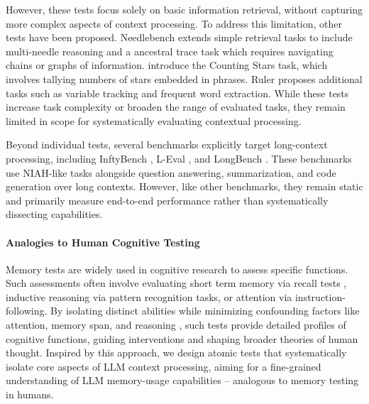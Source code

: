  However, these tests focus solely on basic information retrieval, without capturing more complex aspects of context processing. To address this limitation, other tests have been proposed. Needlebench \cite{ li2024needlebench} extends simple retrieval tasks to include multi-needle reasoning and a ancestral trace task which requires navigating chains or graphs of information. \citet{song2024countingstars} introduce the Counting Stars task, which involves tallying numbers of stars embedded in phrases. Ruler \cite{hsieh2024ruler} proposes additional tasks such as variable tracking and frequent word extraction. While these tests increase task complexity or broaden the range of evaluated tasks, they remain limited in scope for systematically evaluating contextual processing.
 
Beyond individual tests, several benchmarks explicitly target long-context processing, including InftyBench \cite{zhang-etal-2024-bench}, L-Eval \cite{an-etal-2024-l}, and LongBench \cite{bai-etal-2024-longbench}. These benchmarks use NIAH-like tasks alongside question answering, summarization, and code generation over long contexts. However, like other benchmarks, they remain static and primarily measure end-to-end performance rather than systematically dissecting capabilities. 


\paragraph{Analogies to Human Cognitive Testing}
Memory tests are widely used in cognitive research to assess specific functions. Such assessments often involve evaluating short term memory via recall tests \cite{crannell1957comparison, towse2008recall}, inductive reasoning via pattern recognition tasks, or attention via instruction-following\cite{kane2007identifying, nasreddine2005montreal}. By isolating distinct abilities while minimizing confounding factors like attention, memory span, and reasoning \cite{kane2007identifying}, such tests provide detailed profiles of cognitive functions, guiding interventions and shaping broader theories of human thought. Inspired by this approach, we design atomic tests that systematically isolate core aspects of LLM context processing, aiming for a fine-grained understanding of LLM memory-usage capabilities -- analogous to memory testing in humans.


